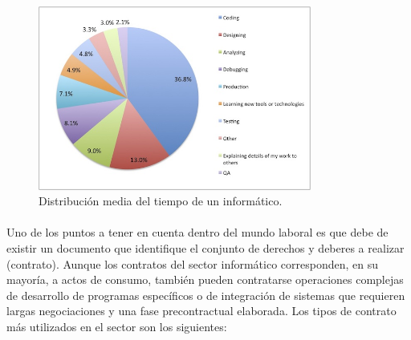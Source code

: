 \documentclass[12pt, a4paper]{report}
\begin{document}
          	 \begin{figure}[htb]
				\centering
				\includegraphics[width=0.8\textwidth]{images/time-spend}
				\caption{Distribución media del tiempo de un informático.\cite{opstalent:keep-date}} 						
                \label{fig:time-spend}
			\end{figure}  
            
            \paragraph{}
            Uno de los puntos a tener en cuenta dentro del mundo laboral es que debe de existir un documento que identifique el conjunto de derechos y deberes a realizar (contrato). Aunque los contratos del sector informático corresponden, en su mayoría, a actos de consumo, también pueden contratarse operaciones complejas de desarrollo de programas específicos o de integración de sistemas que requieren largas negociaciones y una fase precontractual elaborada. Los tipos de contrato más utilizados en el sector son los siguientes: 
            
\end{document}
